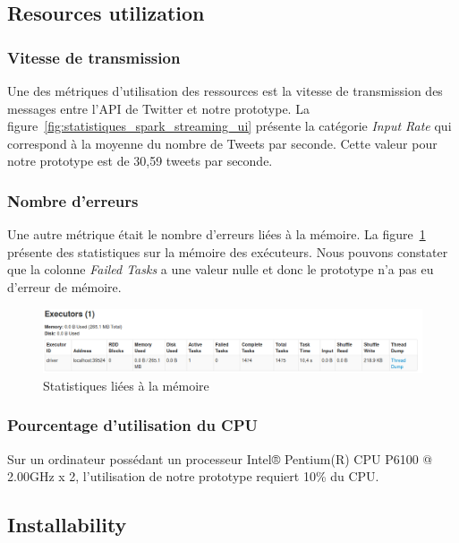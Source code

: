   \subsection{Resources utilization}
    \subsubsection{Vitesse de transmission}
      Une des métriques d'utilisation des ressources est la vitesse de transmission des messages entre l'API de Twitter et notre prototype. La figure~\ref{fig:statistiques_spark_streaming_ui} présente la catégorie \emph{Input Rate} qui correspond à la moyenne du nombre de Tweets par seconde. Cette valeur pour notre prototype est de 30,59 tweets par seconde.

    \subsubsection{Nombre d'erreurs}
      Une autre métrique était le nombre d'erreurs liées à la mémoire. La figure~\ref{fig:executor_spark_streaming_ui} présente des statistiques sur la mémoire des exécuteurs. Nous pouvons constater que la colonne \emph{Failed Tasks} a une valeur nulle et donc le prototype n'a pas eu d'erreur de mémoire.

      \begin{figure}
        \centering
        \includegraphics[width=1.0\textwidth]{images/executor_spark_ui.png}
        \caption{Statistiques liées à la mémoire}
        \label{fig:executor_spark_streaming_ui}
      \end{figure}

    \subsubsection{Pourcentage d'utilisation du CPU}
      Sur un ordinateur possédant un processeur Intel® Pentium(R) CPU P6100 @ 2.00GHz x 2, l'utilisation de notre prototype requiert 10\% du CPU.

  \subsection{Installability}
